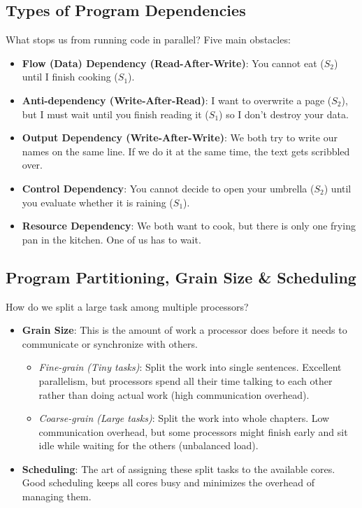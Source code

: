 \documentclass[11pt,a4paper]{article}
\begin{document}
\subsection{Types of Program Dependencies}
What stops us from running code in parallel? Five main obstacles:
\begin{itemize}
    \item \textbf{Flow (Data) Dependency (Read-After-Write)}: You cannot eat ($S_2$) until I finish cooking ($S_1$).
    \item \textbf{Anti-dependency (Write-After-Read)}: I want to overwrite a page ($S_2$), but I must wait until you finish reading it ($S_1$) so I don't destroy your data.
    \item \textbf{Output Dependency (Write-After-Write)}: We both try to write our names on the same line. If we do it at the same time, the text gets scribbled over.
    \item \textbf{Control Dependency}: You cannot decide to open your umbrella ($S_2$) until you evaluate whether it is raining ($S_1$).
    \item \textbf{Resource Dependency}: We both want to cook, but there is only one frying pan in the kitchen. One of us has to wait.
\end{itemize}

\subsection{Program Partitioning, Grain Size \& Scheduling}
How do we split a large task among multiple processors?
\begin{itemize}
    \item \textbf{Grain Size}: This is the amount of work a processor does before it needs to communicate or synchronize with others.
    \begin{itemize}
        \item \textit{Fine-grain (Tiny tasks)}: Split the work into single sentences. Excellent parallelism, but processors spend all their time talking to each other rather than doing actual work (high communication overhead).
        \item \textit{Coarse-grain (Large tasks)}: Split the work into whole chapters. Low communication overhead, but some processors might finish early and sit idle while waiting for the others (unbalanced load).
    \end{itemize}
    \item \textbf{Scheduling}: The art of assigning these split tasks to the available cores. Good scheduling keeps all cores busy and minimizes the overhead of managing them.
\end{itemize}
\end{document}
